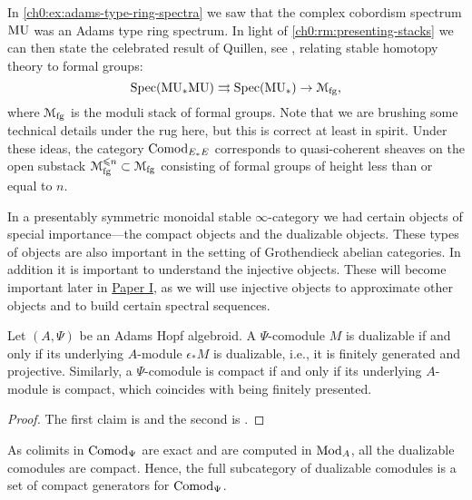 \begin{remark}
    In \cref{ch0:ex:adams-type-ring-spectra} we saw that the complex cobordism spectrum $\MU$ was an Adams type ring spectrum. In light of \cref{ch0:rm:presenting-stacks} we can then state the celebrated result of Quillen, see \cite{quillen_1969}, relating stable homotopy theory to formal groups:
    \[\mathrm{Spec}(\MU_*\MU)\rightrightarrows \mathrm{Spec}(\MU_*)\rightarrow \EuScript{M}_{\mathrm{fg}},\]
    where $\EuScript{M}_{\mathrm{fg}}$ is the moduli stack of formal groups. Note that we are brushing some technical details under the rug here, but this is correct at least in spirit. Under these ideas, the category $\ComodE$ corresponds to quasi-coherent sheaves on the open substack $\EuScript{M}_{\mathrm{fg}}^{\leq n} \subset \EuScript{M}_{\mathrm{fg}}$ consisting of formal groups of height less than or equal to $n$. 
\end{remark}

In a presentably symmetric monoidal stable $\infty$-category we had certain objects of special importance---the compact objects and the dualizable objects. These types of objects are also important in the setting of Grothendieck abelian categories. In addition it is important to understand the injective objects. These will become important later in \hyperref[ch1]{Paper I}, as we will use injective objects to approximate other objects and to build certain spectral sequences.  

\begin{proposition}
    \label{ch0:rm:dualizable/compact-comodules}
    Let $(A, \Psi)$ be an Adams Hopf algebroid. A $\Psi$-comodule $M$ is dualizable if and only if its underlying $A$-module $\epsilon_* M$ is dualizable, i.e., it is finitely generated and projective. Similarly, a $\Psi$-comodule is compact if and only if its underlying $A$-module is compact, which coincides with being finitely presented. 
\end{proposition}
\begin{proof}
    The first claim is \cite[1.3.4]{hovey_04} and the second is \cite[1.4.2]{hovey_04}. 
\end{proof}

\begin{remark}
    \label{ch0:rm:dualizables-compact-generators}
    As colimits in $\Comod_\Psi$ are exact and are computed in $\Mod_A$, all the dualizable comodules are compact. Hence, the full subcategory of dualizable comodules is a set of compact generators for $\Comod_\Psi$. 
\end{remark}

